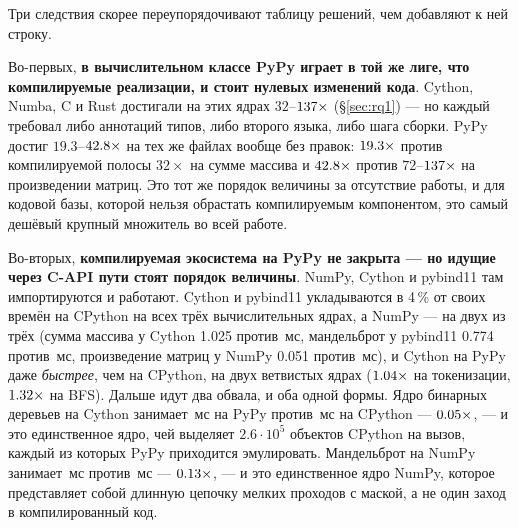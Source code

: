 Три следствия скорее переупорядочивают таблицу решений, чем добавляют к ней строку.

Во-первых, \textbf{в вычислительном классе PyPy играет в той же лиге, что компилируемые
реализации, и стоит нулевых изменений кода}. Cython, Numba, C и Rust достигали на этих ядрах
$32$--$\meas{ratio:b1_compute-314:matmul/cpython_loop|b1_compute-314:matmul/numba_fastmath}{137}\times$ (\S\ref{sec:rq1}) --- но каждый требовал либо аннотаций типов, либо второго
языка, либо шага сборки. PyPy достиг $19.3$--$\meas{ratio:b1_compute-314:matmul/cpython_loop|b1_compute-pypy311:matmul/cpython_loop}{42.8}\times$ на тех же файлах вообще без правок:
$\meas{ratio:b1_compute-314:arraysum/cpython_loop|b1_compute-pypy311:arraysum/cpython_loop}{19.3}\times$ против компилируемой полосы $32\times$ на сумме массива и $\meas{ratio:b1_compute-314:matmul/cpython_loop|b1_compute-pypy311:matmul/cpython_loop}{42.8}\times$ против
$72$--$\meas{ratio:b1_compute-314:matmul/cpython_loop|b1_compute-314:matmul/numba_fastmath}{137}\times$ на произведении матриц. Это тот же порядок величины за отсутствие работы, и для
кодовой базы, которой нельзя обрастать компилируемым компонентом, это самый дешёвый крупный
множитель во всей работе.

Во-вторых, \textbf{компилируемая экосистема на PyPy не закрыта --- но идущие через C-API пути
стоят порядок величины}. NumPy, Cython и pybind11 там импортируются и работают. Cython и pybind11
укладываются в 4\,\% от своих времён на CPython на всех трёх вычислительных ядрах, а NumPy --- на
двух из трёх (сумма массива у Cython 1.025 против \,мс, мандельброт у pybind11 0.774 против
\,мс, произведение матриц у NumPy 0.051 против \,мс), и Cython на PyPy даже
\emph{быстрее}, чем на CPython, на двух ветвистых ядрах ($\meas{ratio:b2_branchy-314:tokenize/cython|b2_branchy-pypy311:tokenize/cython}{1.04}\times$ на токенизации, $\meas{ratio:b2_branchy-314:bfs/cython|b2_branchy-pypy311:bfs/cython}{1.32}\times$
на BFS). Дальше идут два обвала, и оба одной формы. Ядро бинарных деревьев на Cython занимает
\,мс на PyPy против \,мс на CPython --- $\meas{ratio:b2_branchy-314:binarytrees/cython|b2_branchy-pypy311:binarytrees/cython}{0.05}\times$, --- и это единственное ядро, чей
 выделяет $2.6\cdot10^5$ объектов CPython на вызов, каждый из которых PyPy
приходится эмулировать. Мандельброт на NumPy занимает \,мс против \,мс --- $\meas{ratio:b1_compute-314:mandelbrot/numpy|b1_compute-pypy311:mandelbrot/numpy}{0.13}\times$, ---
и это единственное ядро NumPy, которое представляет собой длинную цепочку мелких проходов с маской,
а не один заход в компилированный код.

